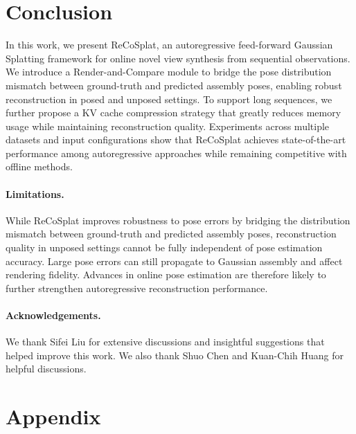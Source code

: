 \documentclass[runningheads]{llncs}
\begin{document}
\section{Conclusion}
In this work, we present ReCoSplat, an autoregressive feed-forward Gaussian Splatting framework for online novel view synthesis from sequential observations. 
We introduce a Render-and-Compare module to bridge the pose distribution mismatch between ground-truth and predicted assembly poses, enabling robust reconstruction in posed and unposed settings. 
To support long sequences, we further propose a KV cache compression strategy that greatly reduces memory usage while maintaining reconstruction quality. 
Experiments across multiple datasets and input configurations show that ReCoSplat achieves state-of-the-art performance among autoregressive approaches while remaining competitive with offline methods.

\vspace{-2mm} \paragraph{\textbf{Limitations.}} 
While ReCoSplat improves robustness to pose errors by bridging the distribution mismatch between ground-truth and predicted assembly poses, reconstruction quality in unposed settings cannot be fully independent of pose estimation accuracy. 
Large pose errors can still propagate to Gaussian assembly and affect rendering fidelity. 
Advances in online pose estimation are therefore likely to further strengthen autoregressive reconstruction performance.

\vspace{-2mm} \paragraph{\textbf{Acknowledgements.}} 
We thank Sifei Liu for extensive discussions and insightful suggestions that helped improve this work.
We also thank Shuo Chen and Kuan-Chih Huang for helpful discussions.

%
%



\newpage

\appendix

\section{Appendix}
\end{document}
